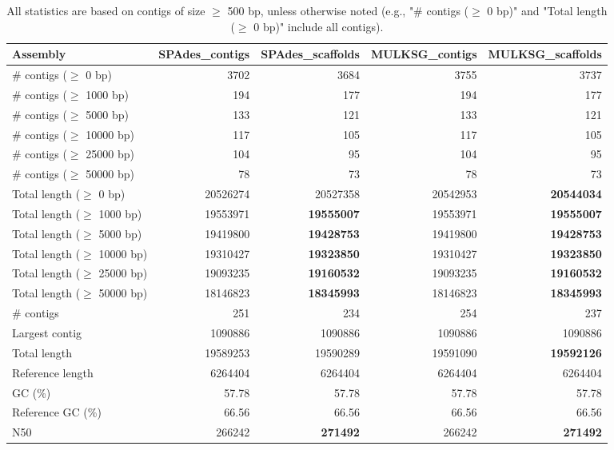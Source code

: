 \documentclass[12pt,a4paper]{article}
\begin{document}
\begin{table}[ht]
\begin{center}
\caption{All statistics are based on contigs of size $\geq$ 500 bp, unless otherwise noted (e.g., "\# contigs ($\geq$ 0 bp)" and "Total length ($\geq$ 0 bp)" include all contigs).}
\begin{tabular}{|l*{4}{|r}|}
\hline
Assembly & SPAdes\_contigs & SPAdes\_scaffolds & MULKSG\_contigs & MULKSG\_scaffolds \\ \hline
\# contigs ($\geq$ 0 bp) & 3702 & 3684 & 3755 & 3737 \\ \hline
\# contigs ($\geq$ 1000 bp) & 194 & 177 & 194 & 177 \\ \hline
\# contigs ($\geq$ 5000 bp) & 133 & 121 & 133 & 121 \\ \hline
\# contigs ($\geq$ 10000 bp) & 117 & 105 & 117 & 105 \\ \hline
\# contigs ($\geq$ 25000 bp) & 104 & 95 & 104 & 95 \\ \hline
\# contigs ($\geq$ 50000 bp) & 78 & 73 & 78 & 73 \\ \hline
Total length ($\geq$ 0 bp) & 20526274 & 20527358 & 20542953 & {\bf 20544034} \\ \hline
Total length ($\geq$ 1000 bp) & 19553971 & {\bf 19555007} & 19553971 & {\bf 19555007} \\ \hline
Total length ($\geq$ 5000 bp) & 19419800 & {\bf 19428753} & 19419800 & {\bf 19428753} \\ \hline
Total length ($\geq$ 10000 bp) & 19310427 & {\bf 19323850} & 19310427 & {\bf 19323850} \\ \hline
Total length ($\geq$ 25000 bp) & 19093235 & {\bf 19160532} & 19093235 & {\bf 19160532} \\ \hline
Total length ($\geq$ 50000 bp) & 18146823 & {\bf 18345993} & 18146823 & {\bf 18345993} \\ \hline
\# contigs & 251 & 234 & 254 & 237 \\ \hline
Largest contig & 1090886 & 1090886 & 1090886 & 1090886 \\ \hline
Total length & 19589253 & 19590289 & 19591090 & {\bf 19592126} \\ \hline
Reference length & 6264404 & 6264404 & 6264404 & 6264404 \\ \hline
GC (\%) & 57.78 & 57.78 & 57.78 & 57.78 \\ \hline
Reference GC (\%) & 66.56 & 66.56 & 66.56 & 66.56 \\ \hline
N50 & 266242 & {\bf 271492} & 266242 & {\bf 271492} \\ \hline

\end{tabular}
\end{center}
\end{table}
\end{document}
